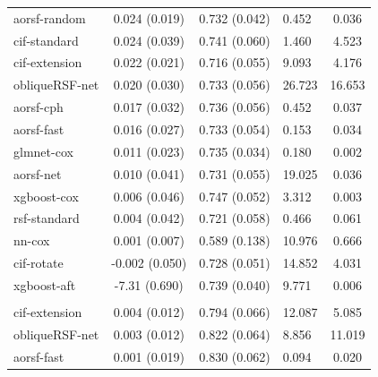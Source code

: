 \documentclass[twoside,11pt]{article}\usepackage[]{graphicx}\usepackage[]{xcolor}
\newenvironment{knitrout}{}{} %
\begin{document}
\begin{knitrout}
\begin{longtable}[t]{lcclc}
\hspace{1em}aorsf-random & 0.024 (0.019) & 0.732 (0.042) & 0.452 & 0.036\\
\hspace{1em}cif-standard & 0.024 (0.039) & 0.741 (0.060) & 1.460 & 4.523\\
\hspace{1em}cif-extension & 0.022 (0.021) & 0.716 (0.055) & 9.093 & 4.176\\
\hspace{1em}obliqueRSF-net & 0.020 (0.030) & 0.733 (0.056) & 26.723 & 16.653\\
\hspace{1em}aorsf-cph & 0.017 (0.032) & 0.736 (0.056) & 0.452 & 0.037\\
\hspace{1em}aorsf-fast & 0.016 (0.027) & 0.733 (0.054) & 0.153 & 0.034\\
\hspace{1em}glmnet-cox & 0.011 (0.023) & 0.735 (0.034) & 0.180 & 0.002\\
\hspace{1em}aorsf-net & 0.010 (0.041) & 0.731 (0.055) & 19.025 & 0.036\\
\hspace{1em}xgboost-cox & 0.006 (0.046) & 0.747 (0.052) & 3.312 & 0.003\\
\hspace{1em}rsf-standard & 0.004 (0.042) & 0.721 (0.058) & 0.466 & 0.061\\
\hspace{1em}nn-cox & 0.001 (0.007) & 0.589 (0.138) & 10.976 & 0.666\\
\hspace{1em}cif-rotate & -0.002 (0.050) & 0.728 (0.051) & 14.852 & 4.031\\
\hspace{1em}xgboost-aft & -7.31 (0.690) & 0.739 (0.040) & 9.771 & 0.006\\
\addlinespace[0.3em]
\hline
\multicolumn{5}{l}{\textit{\textbf{ACTG 320; death, n = 1151, p = 12}}}\\
\hline
\hspace{1em}cif-extension & 0.004 (0.012) & 0.794 (0.066) & 12.087 & 5.085\\
\hspace{1em}obliqueRSF-net & 0.003 (0.012) & 0.822 (0.064) & 8.856 & 11.019\\
\hspace{1em}aorsf-fast & 0.001 (0.019) & 0.830 (0.062) & 0.094 & 0.020\\

\end{longtable}
\end{knitrout}
\end{document}
